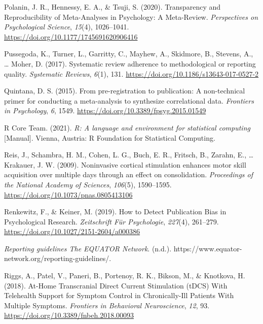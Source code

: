 \documentclass[
  man,floatsintext]{apa6}
\newlength{\cslhangindent}
\newlength{\cslentryspacingunit} %
\newenvironment{CSLReferences}[2] %
 {%
  \setlength{\parindent}{0pt}
  \ifodd #1
  \let\oldpar\par
  \def\par{\hangindent=\cslhangindent\oldpar}
  \fi
  \setlength{\parskip}{#2\cslentryspacingunit}
 }%
 {}
\begin{document}
\begin{CSLReferences}{1}{0}
\leavevmode{}%
Polanin, J. R., Hennessy, E. A., \& Tsuji, S. (2020). Transparency and {Reproducibility} of {Meta-Analyses} in {Psychology}: {A Meta-Review}. \emph{Perspectives on Psychological Science}, \emph{15}(4), 1026--1041. \url{https://doi.org/10.1177/1745691620906416}

\leavevmode{}%
Pussegoda, K., Turner, L., Garritty, C., Mayhew, A., Skidmore, B., Stevens, A., \ldots{} Moher, D. (2017). Systematic review adherence to methodological or reporting quality. \emph{Systematic Reviews}, \emph{6}(1), 131. \url{https://doi.org/10.1186/s13643-017-0527-2}

\leavevmode{}%
Quintana, D. S. (2015). From pre-registration to publication: A non-technical primer for conducting a meta-analysis to synthesize correlational data. \emph{Frontiers in Psychology}, \emph{6}, 1549. \url{https://doi.org/10.3389/fpsyg.2015.01549}

\leavevmode{}%
R Core Team. (2021). \emph{R: {A} language and environment for statistical computing} {[}Manual{]}. {Vienna, Austria}: {R Foundation for Statistical Computing}.

\leavevmode{}%
Reis, J., Schambra, H. M., Cohen, L. G., Buch, E. R., Fritsch, B., Zarahn, E., \ldots{} Krakauer, J. W. (2009). Noninvasive cortical stimulation enhances motor skill acquisition over multiple days through an effect on consolidation. \emph{Proceedings of the National Academy of Sciences}, \emph{106}(5), 1590--1595. \url{https://doi.org/10.1073/pnas.0805413106}

\leavevmode{}%
Renkewitz, F., \& Keiner, M. (2019). How to {Detect Publication Bias} in {Psychological Research}. \emph{Zeitschrift Für Psychologie}, \emph{227}(4), 261--279. \url{https://doi.org/10.1027/2151-2604/a000386}

\leavevmode{}%
\emph{Reporting guidelines \textbar{} {The EQUATOR Network}}. (n.d.). https://www.equator-network.org/reporting-guidelines/.

\leavevmode{}%
Riggs, A., Patel, V., Paneri, B., Portenoy, R. K., Bikson, M., \& Knotkova, H. (2018). At-{Home Transcranial Direct Current Stimulation} ({tDCS}) {With Telehealth Support} for {Symptom Control} in {Chronically-Ill Patients With Multiple Symptoms}. \emph{Frontiers in Behavioral Neuroscience}, \emph{12}, 93. \url{https://doi.org/10.3389/fnbeh.2018.00093}


\end{CSLReferences}
\end{document}

